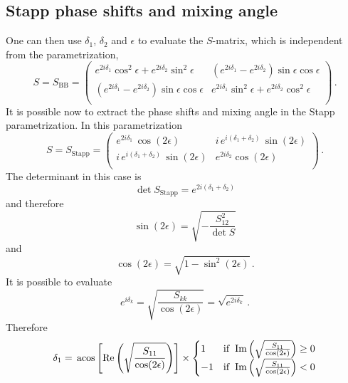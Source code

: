 \documentclass[10pt,a4paper]{article}
\newcommand{\mtm}[1]{\mathrm{#1}}
\begin{document}
	\subsection{Stapp phase shifts and mixing angle}
	One can then use $\delta_1$, $\delta_2$ and $\epsilon$ to evaluate  the $S$-matrix, which is independent from the parametrization,
	\begin{equation}
		S = S_\mtm{BB} = 
		\left(
		\begin{array}{cc}
			e^{2 i \delta _1} \cos ^2\epsilon + e^{2 i \delta _2} \sin ^2\epsilon & 
			\left(e^{2 i \delta _1} -e^{2 i \delta _2}\right) \sin \epsilon  \cos\epsilon \\
			\left(e^{2 i \delta _1} -e^{2 i \delta _2}\right) \sin \epsilon  \cos\epsilon &
			e^{2 i \delta _1} \sin ^2\epsilon+e^{2 i \delta _2} \cos
			^2\epsilon \\
		\end{array}
		\right)\,.
		\label{SBB}
	\end{equation}
	It is possible now to extract the phase shifts and mixing angle in the Stapp parametrization.
	In this parametrization 
	\begin{equation}
		S = S_\mtm{Stapp} = 
		\left(
		\begin{array}{cc}
			e^{2 i \delta _1} \,\cos (2 \epsilon ) & i \,e^{i (\delta _1+\delta _2)}\, \sin (2 \epsilon ) \\
			i\, e^{i (\delta _1+\delta _2)}\, \sin (2 \epsilon ) & e^{2 i \delta _2} \cos (2 \epsilon ) \\
		\end{array}
		\right)\,.
	\end{equation}
	The determinant in this case is 
	\begin{equation}
		\det S_\mtm{Stapp} = e^{2 i \left(\delta _1+\delta _2\right)}
	\end{equation}
	and therefore
	\begin{equation}
		\sin(2\epsilon) = \sqrt{-\frac{S_{12}^2}{\det S}}
		\label{eq:epsStapp}
	\end{equation}
	and 
	\begin{equation}
		\cos(2\epsilon) = \sqrt{1-\sin^2(2\epsilon)}\,.
	\end{equation}
	It is possible to evaluate
	\begin{equation}
		e^{i\delta_k} = \sqrt{\frac{S_{kk}}{\cos(2\epsilon)}}
		=
		\sqrt{e^{2i\delta_k}}\,.
	\end{equation}
	Therefore
	\begin{equation}
		\delta_1 =
		\,\acos\left[\Re\left(\sqrt{\frac{S_{11}}{\cos(2\epsilon)}}\right)\right]
		\times
		\begin{cases}
			1 & \mathrm{if~}\Im\left(\sqrt{\frac{S_{11}}{\cos(2\epsilon)}}\right) \ge 0 \\
			-1 & \mathrm{if~}\Im\left(\sqrt{\frac{S_{11}}{\cos(2\epsilon)}}\right) < 0
		\end{cases}
	\end{equation}
\end{document}
